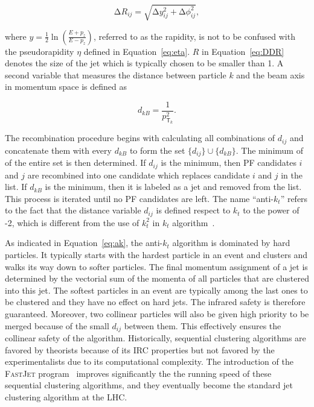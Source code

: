 \begin{equation}
\mathrm{\Delta}R_{ij} = \sqrt{\mathrm{\Delta}y_{ij}^2+\mathrm{\Delta}\phi_{ij}^2},
\label{eq:DDR}
\end{equation}

where $y=\frac{1}{2}\ln(\frac{E+p_z}{E-p_z})$, referred to as the rapidity, is not to be confused with the pseudorapidity $\eta$ defined in Equation~\ref{eq:eta}. $R$ in Equation~\ref{eq:DDR} denotes the size of the jet which is typically chosen to be smaller than 1. A second variable that measures the distance between particle $k$ and the beam axis in momentum space is defined as 

\begin{equation}
d_{kB} = \frac{1}{p_{\textsf{T}_k}^2}.
\end{equation}

The recombination procedure begins with calculating all combinations of $d_{ij}$ and concatenate them with every $d_{kB}$ to form the set $\{d_{ij}\}\cup\{d_{kB}\}$. The minimum of of the entire set is then determined. If $d_{ij}$ is the minimum, then \ac{PF} candidates $i$ and $j$ are recombined into one candidate which replaces candidate $i$ and $j$ in the list. If $d_{kB}$ is the minimum, then it is labeled as a jet and removed from the list. This process is iterated until no \ac{PF} candidates are left. The name ``anti-$k_t$'' refers to the fact that the distance variable $d_{ij}$ is defined respect to $k_t$ to the power of -2, which is different from the use of $k_t^2$ in $k_t$ algorithm~\cite{Ellis:1993tq}. 

As indicated in Equation~\ref{eq:ak}, the anti-$k_t$ algorithm is dominated by hard particles. It typically starts with the hardest particle in an event and clusters and walks its way down to softer particles. The final momentum assignment of a jet is determined by the vectorial sum of the momenta of all particles that are clustered into this jet. The softest particles in an event are typically among the last ones to be clustered and they have no effect on hard jets. The infrared safety is therefore guaranteed. Moreover, two collinear particles will also be given high priority to be merged because of the small $d_{ij}$ between them. This effectively ensures the collinear safety of the algorithm. Historically, sequential clustering algorithms are favored by theorists because of its \ac{IRC} properties but not favored by the experimentalists due to its computational complexity. The introduction of the \textsc{FastJet} program~\cite{Cacciari:2011ma} improves significantly the the running speed of these sequential clustering algorithms, and they eventually become the standard jet clustering algorithm at the \ac{LHC}.

